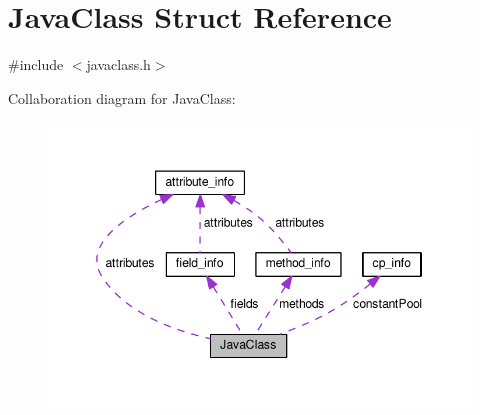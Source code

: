 \hypertarget{structJavaClass}{}\section{Java\+Class Struct Reference}
\label{structJavaClass}


{\ttfamily \#include $<$javaclass.\+h$>$}



Collaboration diagram for Java\+Class\+:\nopagebreak
\begin{figure}[H]
\begin{center}
\leavevmode
\includegraphics[width=349pt]{structJavaClass__coll__graph}
\end{center}
\end{figure}
